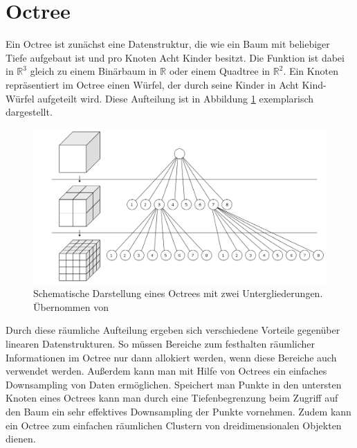 \section{Octree}

Ein Octree ist zunächst eine Datenstruktur, die wie ein Baum mit beliebiger Tiefe aufgebaut ist und pro Knoten Acht Kinder besitzt. Die Funktion ist dabei in \(\mathbb{R}^3\) gleich zu einem Binärbaum in \(\mathbb{R}\) oder einem Quadtree in \(\mathbb{R}^2\). Ein Knoten repräsentiert im Octree einen Würfel, der durch seine Kinder in Acht Kind-Würfel aufgeteilt wird. Diese Aufteilung ist in Abbildung \ref{fig:octree} exemplarisch dargestellt.\\

\begin{figure}[h]
  \centering
	\includegraphics[width=1.0\textwidth]{content/images/theory/octree.png} 
  \caption{Schematische Darstellung eines Octrees mit zwei Untergliederungen. Übernommen von \citet{dumusc2011multi}}
  \label{fig:octree}
\end{figure}

Durch diese räumliche Aufteilung ergeben sich verschiedene Vorteile gegenüber linearen Datenstrukturen. So müssen Bereiche zum festhalten räumlicher Informationen im Octree nur dann allokiert werden, wenn diese Bereiche auch verwendet werden. Außerdem kann man mit Hilfe von Octrees ein einfaches Downsampling von Daten ermöglichen. Speichert man Punkte in den untersten Knoten eines Octrees kann man durch eine Tiefenbegrenzung beim Zugriff auf den Baum ein sehr effektives Downsampling der Punkte vornehmen. Zudem kann ein Octree zum einfachen räumlichen Clustern von dreidimensionalen Objekten dienen.\\